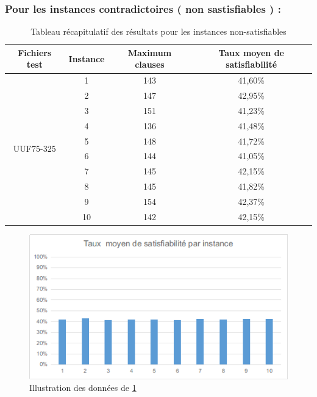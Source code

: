 \subsubsection{Pour les instances contradictoires ( non sastisfiables ) : }
\begin{table}[H]
	\centering
	\label{table:Tab_BFS_Non_Sat}
	\begin{tabular}{|c|c|c|c|}
		\hline
		Fichiers test               & Instance & Maximum clauses & Taux moyen de satisfiabilité \\ \hline
		\multirow{10}{*}{UUF75-325} & 1        & 143             & 41,60\%                      \\ \cline{2-4} 
		& 2        & 147             & 42,95\%                      \\ \cline{2-4} 
		& 3        & 151             & 41,23\%                      \\ \cline{2-4} 
		& 4        & 136             & 41,48\%                      \\ \cline{2-4} 
		& 5        & 148             & 41,72\%                      \\ \cline{2-4} 
		& 6        & 144             & 41,05\%                      \\ \cline{2-4} 
		& 7        & 145             & 42,15\%                      \\ \cline{2-4} 
		& 8        & 145             & 41,82\%                      \\ \cline{2-4} 
		& 9        & 154             & 42,37\%                      \\ \cline{2-4} 
		& 10       & 142             & 42,15\%                      \\ \hline
	\end{tabular}
	\caption{Tableau récapitulatif des résultats pour les instances non-satisfiables}
\end{table}
\begin{figure}[H]
	\includegraphics[width=\textwidth]{images/BFSUUF75Graph.png}
	\caption{Illustration des données de \ref{table:Tab_BFS_Non_Sat}}
\end{figure}

